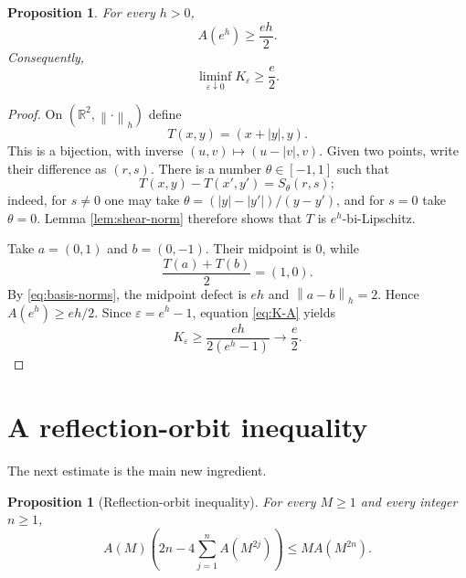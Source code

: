 \documentclass[11pt]{article}
\newtheorem{proposition}[theorem]{Proposition}
\theoremstyle{remark}
\newcommand{\R}{\mathbb{R}}
\newcommand{\eps}{\varepsilon}
\newcommand{\norm}[1]{\left\lVert #1\right\rVert}
\begin{document}
\begin{proposition}\label{prop:lower}
For every $h>0$,
\[
 A(e^h)\ge \frac{eh}{2}.
\]
Consequently,
\[
 \liminf_{\eps\downarrow0}K_{\eps}\ge \frac e2.
\]
\end{proposition}

\begin{proof}
On $(\R^2,\norm{\cdot}_h)$ define
\[
 T(x,y)=(x+|y|,y).
\]
This is a bijection, with inverse $(u,v)\mapsto(u-|v|,v)$.  Given two
points, write their difference as $(r,s)$.  There is a number
$\theta\in[-1,1]$ such that
\[
 T(x,y)-T(x',y')=S_\theta(r,s);
\]
indeed, for $s\ne0$ one may take
$\theta=(|y|-|y'|)/(y-y')$, and for $s=0$ take $\theta=0$.
Lemma \ref{lem:shear-norm} therefore shows that $T$ is
$e^h$-bi-Lipschitz.

Take $a=(0,1)$ and $b=(0,-1)$.  Their midpoint is $0$, while
\[
 \frac{T(a)+T(b)}2=(1,0).
\]
By \eqref{eq:basis-norms}, the midpoint defect is $eh$ and
$\norm{a-b}_h=2$.  Hence $A(e^h)\ge eh/2$.  Since
$\eps=e^h-1$, equation \eqref{eq:K-A} yields
\[
 K_{\eps}\ge \frac{eh}{2(e^h-1)}\longrightarrow\frac e2.
\]
\end{proof}

\section{A reflection-orbit inequality}

The next estimate is the main new ingredient.

\begin{proposition}[Reflection-orbit inequality]\label{prop:orbit}
For every $M\ge1$ and every integer $n\ge1$,
\begin{equation}\label{eq:orbit}
 A(M)\left(2n-4\sum_{j=1}^n A(M^{2j})\right)
 \le M A(M^{2n}).
\end{equation}
\end{proposition}
\end{document}

